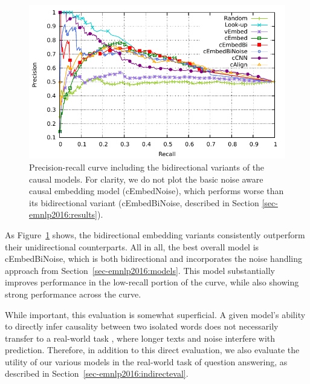 \begin{figure}[th!]
\begin{center}
\includegraphics[width=\textwidth]{mainmatter/emnlp2016-causal/direct2.pdf} %
\caption{{Precision-recall curve including the bidirectional variants of the causal models. For clarity, we do not plot the basic noise aware causal embedding model (cEmbedNoise), which performs worse than its bidirectional variant (cEmbedBiNoise, described in Section \ref{sec-emnlp2016:results}). }}
\label{fig:rpcurve_withBi}
\end{center}
\end{figure}

As Figure~\ref{fig:rpcurve_withBi} shows, the bidirectional embedding variants consistently outperform their unidirectional counterparts.
All in all, the best overall model is cEmbedBiNoise, which is both bidirectional and incorporates the noise handling approach from Section~\ref{sec-emnlp2016:models}. This model substantially improves performance in the low-recall portion of the curve, while also showing strong performance across the curve. 

While important, this evaluation is somewhat superficial.  A given model's ability to directly infer causality between two isolated words does not necessarily transfer to a real-world task \citep{faruqui2016problems}, where longer texts and noise interfere with prediction.  Therefore, in addition to this direct evaluation, we also evaluate the utility of our various models in the real-world task of question answering, as described in Section~\ref{sec-emnlp2016:indirecteval}.  